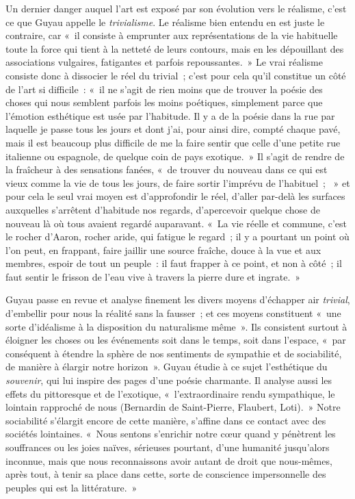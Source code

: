 \documentclass[french,twoside]{book} %
\begin{document}
Un dernier danger auquel l’art est exposé par son évolution vers le réalisme, c’est ce que Guyau appelle le \emph{trivialisme}. Le réalisme bien entendu en est juste le contraire, car « il consiste à emprunter aux représentations de la vie habituelle toute la force qui tient à la netteté de leurs contours, mais en les dépouillant des associations vulgaires, fatigantes et parfois repoussantes. » Le vrai réalisme consiste donc à dissocier le réel du trivial ; c’est pour cela qu’il constitue un côté de l’art si difficile : « il ne s’agit de rien moins que de trouver la poésie des choses qui nous semblent parfois les moins poétiques, simplement parce que l’émotion esthétique est usée par l’habitude. Il y a de la poésie dans la rue par laquelle je passe tous les jours et dont j’ai, pour ainsi dire, compté chaque pavé, mais il est beaucoup plus difficile de me la faire sentir que celle d’une petite rue italienne ou espagnole, de quelque coin de pays exotique. » Il s’agit de rendre de la fraîcheur à des sensations fanées, « de trouver du nouveau dans ce qui est vieux comme la vie de tous les jours, de faire sortir l’imprévu de l’habituel ;  » et pour cela le seul vrai moyen est d’approfondir le réel, d’aller par-delà les surfaces auxquelles s’arrêtent d’habitude nos regards, d’apercevoir quelque chose de nouveau là où tous avaient regardé auparavant. « La vie réelle et commune, c’est le rocher d’Aaron, rocher aride, qui fatigue le regard ; il y a pourtant un point où l’on peut, en frappant, faire jaillir une source fraîche, douce à la vue et aux membres, espoir de tout un peuple : il faut frapper à ce point, et non à côté ; il faut sentir le frisson de l’eau vive à travers la pierre dure et ingrate. »\par
Guyau passe en revue et analyse finement les divers moyens d’échapper air \emph{trivial}, d’embellir pour nous la réalité sans la fausser ; et ces moyens constituent « une sorte d’idéalisme à la disposition du naturalisme même ». Ils consistent surtout à éloigner les choses ou les événements soit dans le temps, soit dans l’espace, « par conséquent à étendre la sphère de nos sentiments de sympathie et de sociabilité, de manière à élargir notre horizon ». Guyau étudie à ce sujet l’esthétique du \emph{souvenir}, qui lui inspire des pages d’une poésie charmante. Il analyse aussi les effets du pittoresque et de l’exotique, « l’extraordinaire rendu sympathique, le lointain rapproché de nous (Bernardin de Saint-Pierre, Flaubert, Loti). » Notre sociabilité s’élargit encore de cette manière, s’affine dans ce contact avec des sociétés lointaines. « Nous sentons s’enrichir notre cœur quand y pénètrent les souffrances ou les joies naïves, sérieuses pourtant, d’une humanité jusqu’alors inconnue, mais que nous reconnaissons avoir autant de droit que nous-mêmes, après tout, à tenir sa place dans cette, sorte de conscience impersonnelle des peuples qui est la littérature. »\par
\end{document}
